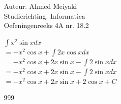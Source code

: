 \documentclass[a4paper]{article}
\begin{document}
  
\noindent \large Auteur: Ahmed Meiyaki \\
\noindent \large Studierichting: Informatica\\
\noindent \large Oefeningenreeks 4A nr. 18.2\\

\medskip

\normalsize

$\displaystyle\int x^2 \sin x dx $\\

$= -x^2\cos x + \displaystyle\int 2x \cos x dx $\\

$= -x^2\cos x + 2x\sin x - \displaystyle\int 2\sin x dx $\\

$= -x^2\cos x + 2x\sin x - \displaystyle\int 2\sin x dx $\\

$= -x^2\cos x + 2x\sin x + 2\cos x + C $\\


\begin{thebibliography}{999}
\end{thebibliography}
\end{document}
